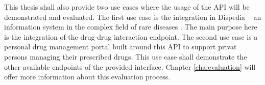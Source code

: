 This thesis shall also provide two use cases where the usage of the API will be demonstrated and evaluated.
The first use case is the integration in Dispedia -- an information system in the complex field of rare diseases \cite{elze2013dispedia}.
The main purpose here is the integration of the drug-drug interaction endpoint.
The second use case is a personal drug management portal built around this API to support privat persons managing their prescribed drugs.
This use case shall demonstrate the other available endpoints of the provided interface.
Chapter \ref{cha:evaluation} will offer more information about this evaluation process.


